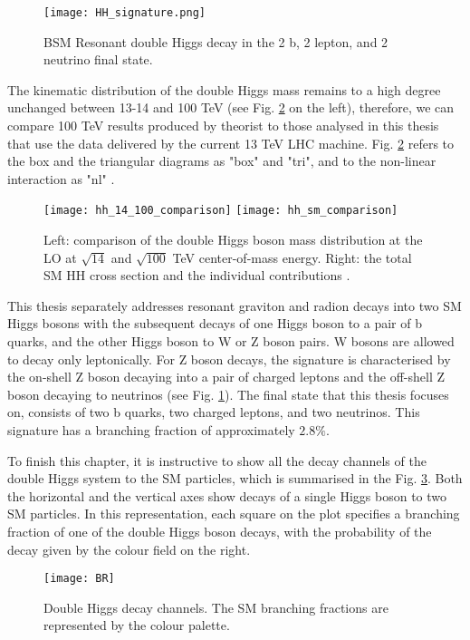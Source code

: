 \begin{figure}[H]
  \centering
    \texttt{[image: HH\_signature.png]}
    \caption{BSM Resonant double Higgs decay in the 2 b, 2 lepton, and 2 neutrino final state. }
    \label{HH_signature}
\end{figure}


The kinematic distribution of the double Higgs mass remains to a high degree unchanged between 13-14 and 100 TeV (see Fig. \ref{hh_comparison} on the left), therefore, we can compare 100 TeV results produced by theorist to those analysed in this thesis that use the data delivered by the current 13 TeV LHC machine. Fig. \ref{hh_comparison} refers to the box and the triangular diagrams as "box" and "tri", and to the non-linear interaction as "nl"  \cite{Contino:2012xk}. 

\begin{figure}[H]
  \centering 
    \texttt{[image: hh\_14\_100\_comparison]}
    \texttt{[image: hh\_sm\_comparison]}
    \caption[Double Higgs mass distribution and the total cross-section]{Left: comparison of the double Higgs boson mass distribution at the LO at $\sqrt{14}$ and $\sqrt{100}$ TeV center-of-mass energy. Right: the total SM HH cross section and the individual contributions \cite{Contino:2012xk}.}
    \label{hh_comparison}
\end{figure}

This thesis separately addresses resonant graviton and radion decays into two SM Higgs bosons with the subsequent decays of one Higgs boson to a pair of b quarks, and the other Higgs boson to W or Z boson pairs. W bosons are allowed to decay only leptonically. For Z boson decays, the signature is characterised by the on-shell Z boson decaying into a pair of charged leptons and the off-shell Z boson decaying to neutrinos (see Fig. \ref{HH_signature}). The final state that this thesis focuses on, consists of two b quarks, two charged leptons, and two neutrinos. This signature has a branching fraction of approximately $2.8 \%$. 


To finish this chapter, it is instructive to show all the decay channels of the double Higgs system to the SM particles, which is summarised in the Fig. \ref{BR}. Both the horizontal and the vertical axes show decays of a single Higgs boson to two SM particles. In this representation, each square on the plot specifies a branching fraction of one of the double Higgs boson decays, with the probability of the decay given by the colour field on the right. 

\begin{figure}[H]
  \centering
    \texttt{[image: BR]}
    \caption[Double Higgs decay channels]{Double Higgs decay channels. The SM branching fractions are represented by the colour palette.}
    \label{BR}
\end{figure}



